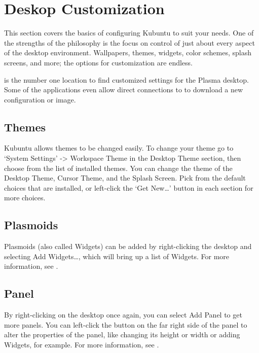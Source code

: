 \documentclass[letterpaper,10pt,english]{sphinxmanual}
\begin{document}
\section{Deskop Customization}
\label{\detokenize{docs/basic:deskop-customization}}
This section covers the basics of configuring Kubuntu to suit your needs. One of the strengths of the  philosophy is the focus on control of just about every aspect of the desktop environment. Wallpapers, themes, widgets, color schemes, splash screens, and more; the options for customization are endless.

 is the number one location to find customized settings for the  Plasma desktop. Some of the applications even allow direct connections to  to download a new configuration or image.


\subsection{Themes}
\label{\detokenize{docs/basic:themes}}
Kubuntu allows themes to be changed easily. To change your theme go to ‘System Settings’ -\textgreater{} Workspace Theme in the Desktop Theme section, then choose from the list of installed themes. You can change the theme of the Desktop Theme, Cursor Theme, and the Splash Screen. Pick from the default choices that are installed, or left-click the ‘Get New…’ button in each section for more choices.


\subsection{Plasmoids}
\label{\detokenize{docs/basic:plasmoids}}
Plasmoids (also called Widgets) can be added by right-clicking the desktop and selecting Add Widgets…, which will bring up a list of Widgets. For more information, see .


\subsection{Panel}
\label{\detokenize{docs/basic:panel}}

By right-clicking on the desktop once again, you can select Add Panel to get more panels. You can left-click the button on the far right side of the panel to alter the properties of the panel, like changing its height or width or adding Widgets, for example. For more information, see .
\end{document}
